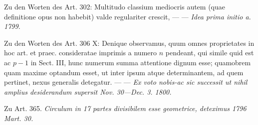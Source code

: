 Zu den Worten des Art. 302: Multitudo classium mediocris autem (quae definitione opus non habebit) valde regulariter crescit, — — \textit{Idea prima initio a. 1799.}


Zu den Worten des Art. 306 X: Denique observamus, quum omnes proprietates in hoc art. et praec. consideratae imprimis a numero \(n\) pendeant, qui simile quid est ac \(p-1\) in Sect. III, hunc numerum summa attentione dignum esse; quamobrem quam maxime optandum esset, ut inter ipsum atque determinantem, ad quem pertinet, nexus generalis detegatur. — — \textit{Ex voto nobis-ac sic successit ut nihil amplius desiderandum supersit Nov. 30—Dec. 3. 1800.}


Zu Art. 365. \textit{Circulum in 17 partes divisibilem esse geometrice, deteximus 1796 Mart. 30.}


\clearpage
